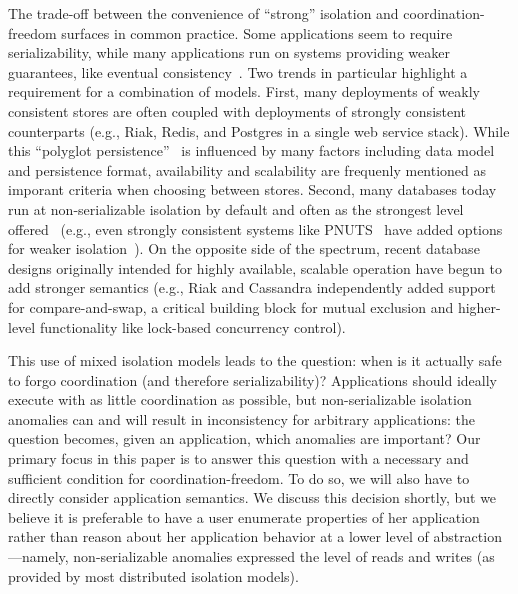 
 The trade-off between
the convenience of ``strong'' isolation and coordination-freedom
surfaces in common practice. Some applications seem to require
serializability, while many applications run on systems providing
weaker guarantees, like eventual consistency~\cite{vogels-defs}. Two
trends in particular highlight a requirement for a combination of
models. First, many deployments of weakly consistent stores are often
coupled with deployments of strongly consistent counterparts (e.g.,
Riak, Redis, and Postgres in a single web service stack). While this
``polyglot persistence''~\cite{polyglot} is influenced by many factors
including data model and persistence format, availability and
scalability are frequenly mentioned as imporant criteria when choosing
between stores. Second, many databases today run at non-serializable
isolation by default and often as the strongest level
offered~\cite{hat-vldb} (e.g., even strongly consistent systems like
PNUTS~\cite{pnuts} have added options for weaker
isolation~\cite{pnuts-update}). On the opposite side of the spectrum,
recent database designs originally intended for highly available,
scalable operation have begun to add stronger semantics (e.g., Riak
and Cassandra independently added support for compare-and-swap, a
critical building block for mutual exclusion and higher-level
functionality like lock-based concurrency control).

This use of mixed isolation models leads to the question: when is it
actually safe to forgo coordination (and therefore serializability)?
Applications should ideally execute with as little coordination as
possible, but non-serializable isolation anomalies can and will result
in inconsistency for arbitrary applications: the question becomes,
given an application, which anomalies are important? Our primary focus
in this paper is to answer this question with a necessary and
sufficient condition for coordination-freedom. To do so, we will also
have to directly consider application semantics. We discuss this
decision shortly, but we believe it is preferable to have a user
enumerate properties of her application rather than reason about her
application behavior at a lower level of abstraction---namely,
non-serializable anomalies expressed the level of reads and writes (as
provided by most distributed isolation models).

